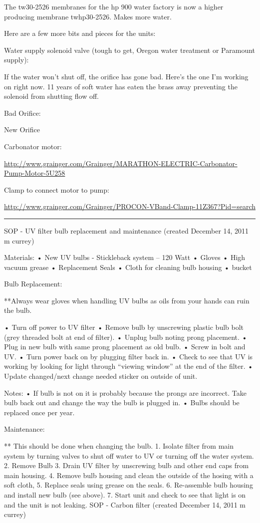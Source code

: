 \documentclass[
]{book}
\begin{document}
The tw30-2526 membranes for the hp 900 water factory is now a higher producing membrane twhp30-2526. Makes more water.

Here are a few more bits and pieces for the units:

Water supply solenoid valve (tough to get, Oregon water treatment or Paramount supply):

If the water won't shut off, the orifice has gone bad. Here's the one I'm working on right now. 11 years of soft water has eaten the brass away preventing the solenoid from shutting flow off.

Bad Orifice:

New Orifice

Carbonator motor:

\url{http://www.grainger.com/Grainger/MARATHON-ELECTRIC-Carbonator-Pump-Motor-5U258}

Clamp to connect motor to pump:

\url{http://www.grainger.com/Grainger/PROCON-VBand-Clamp-11Z367?Pid=search}

\begin{center}\rule{0.5\linewidth}{0.5pt}\end{center}

SOP - UV filter bulb replacement and maintenance
(created December 14, 2011 m currey)

Materials:
• New UV bulbs - Stickleback system -- 120 Watt
• Gloves
• High vacuum grease
• Replacement Seals
• Cloth for cleaning bulb housing
• bucket

Bulb Replacement:

**Always wear gloves when handling UV bulbs as oils from your hands can ruin the bulb.

• Turn off power to UV filter
• Remove bulb by unscrewing plastic bulb bolt (grey threaded bolt at end of filter).
• Unplug bulb noting prong placement.
• Plug in new bulb with same prong placement as old bulb.
• Screw in bolt and UV.
• Turn power back on by plugging filter back in.
• Check to see that UV is working by looking for light through ``viewing window'' at the end of the filter.
• Update changed/next change needed sticker on outside of unit.

Notes:
• If bulb is not on it is probably because the prongs are incorrect. Take bulb back out and change the way the bulb is plugged in.
• Bulbs should be replaced once per year.

Maintenance:

** This should be done when changing the bulb.
1. Isolate filter from main system by turning valves to shut off water to UV or turning off the water system.
2. Remove Bulb
3. Drain UV filter by unscrewing bulb and other end caps from main housing.
4. Remove bulb housing and clean the outside of the hosing with a soft cloth,
5. Replace seals using grease on the seals.
6. Re-assemble bulb housing and install new bulb (see above).
7. Start unit and check to see that light is on and the unit is not leaking.
SOP - Carbon filter
(created December 14, 2011 m currey)
\end{document}
